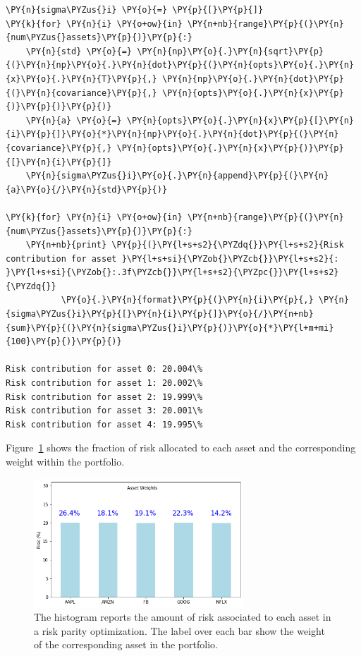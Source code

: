 \begin{tcolorbox}[breakable, size=fbox, boxrule=1pt, pad at break*=1mm,colback=cellbackground, colframe=cellborder]
\begin{Verbatim}[commandchars=\\\{\}]
\PY{n}{sigma\PYZus{}i} \PY{o}{=} \PY{p}{[}\PY{p}{]}
\PY{k}{for} \PY{n}{i} \PY{o+ow}{in} \PY{n+nb}{range}\PY{p}{(}\PY{n}{num\PYZus{}assets}\PY{p}{)}\PY{p}{:}
    \PY{n}{std} \PY{o}{=} \PY{n}{np}\PY{o}{.}\PY{n}{sqrt}\PY{p}{(}\PY{n}{np}\PY{o}{.}\PY{n}{dot}\PY{p}{(}\PY{n}{opts}\PY{o}{.}\PY{n}{x}\PY{o}{.}\PY{n}{T}\PY{p}{,} \PY{n}{np}\PY{o}{.}\PY{n}{dot}\PY{p}{(}\PY{n}{covariance}\PY{p}{,} \PY{n}{opts}\PY{o}{.}\PY{n}{x}\PY{p}{)}\PY{p}{)}\PY{p}{)} 
    \PY{n}{a} \PY{o}{=} \PY{n}{opts}\PY{o}{.}\PY{n}{x}\PY{p}{[}\PY{n}{i}\PY{p}{]}\PY{o}{*}\PY{n}{np}\PY{o}{.}\PY{n}{dot}\PY{p}{(}\PY{n}{covariance}\PY{p}{,} \PY{n}{opts}\PY{o}{.}\PY{n}{x}\PY{p}{)}\PY{p}{[}\PY{n}{i}\PY{p}{]} 
    \PY{n}{sigma\PYZus{}i}\PY{o}{.}\PY{n}{append}\PY{p}{(}\PY{n}{a}\PY{o}{/}\PY{n}{std}\PY{p}{)}

\PY{k}{for} \PY{n}{i} \PY{o+ow}{in} \PY{n+nb}{range}\PY{p}{(}\PY{n}{num\PYZus{}assets}\PY{p}{)}\PY{p}{:}
    \PY{n+nb}{print} \PY{p}{(}\PY{l+s+s2}{\PYZdq{}}\PY{l+s+s2}{Risk contribution for asset }\PY{l+s+si}{\PYZob{}\PYZcb{}}\PY{l+s+s2}{: }\PY{l+s+si}{\PYZob{}:.3f\PYZcb{}}\PY{l+s+s2}{\PYZpc{}}\PY{l+s+s2}{\PYZdq{}}
           \PY{o}{.}\PY{n}{format}\PY{p}{(}\PY{n}{i}\PY{p}{,} \PY{n}{sigma\PYZus{}i}\PY{p}{[}\PY{n}{i}\PY{p}{]}\PY{o}{/}\PY{n+nb}{sum}\PY{p}{(}\PY{n}{sigma\PYZus{}i}\PY{p}{)}\PY{o}{*}\PY{l+m+mi}{100}\PY{p}{)}\PY{p}{)}

Risk contribution for asset 0: 20.004\%
Risk contribution for asset 1: 20.002\%
Risk contribution for asset 2: 19.999\%
Risk contribution for asset 3: 20.001\%
Risk contribution for asset 4: 19.995\%
\end{Verbatim}
\end{tcolorbox}

Figure~\ref{fig:risk_parity} shows the fraction of risk allocated to each asset and the corresponding weight within the portfolio.

\begin{figure}[htb]
	\centering
	\includegraphics[width=0.7\textwidth]{figures/risk_parity.png}
	\caption{The histogram reports the amount of risk associated to each asset in a risk parity optimization. The label over each bar show the weight of the corresponding asset in the portfolio.}
	\label{fig:risk_parity}
\end{figure}

